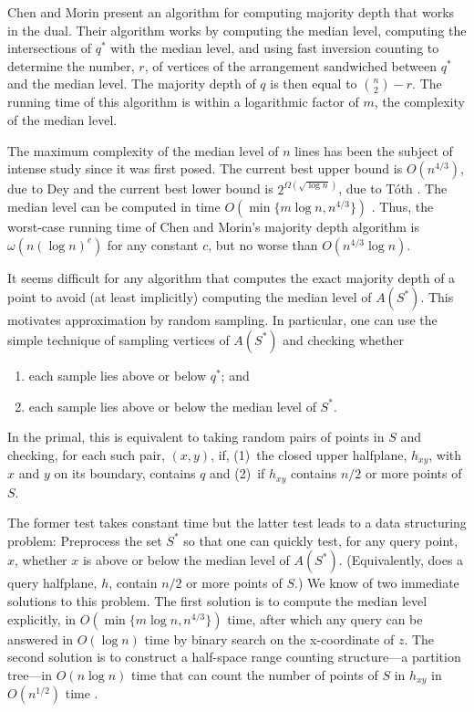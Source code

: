 \documentclass{patmorin}
\begin{document}
Chen and Morin \cite{cm11} present an algorithm for computing majority
depth that works in the dual.  Their algorithm works by computing the
median level, computing the intersections of $q^*$ with the median
level, and using fast inversion counting to determine the number, $r$,
of vertices of the arrangement sandwiched between $q^*$ and the median
level.  The majority depth of $q$ is then equal to $\binom{n}{2}-r$.
The running time of this algorithm is within a logarithmic factor of $m$,
the complexity of the median level.

The maximum complexity of the median level of $n$ lines has been the
subject of intense study since it was first posed.  The current best
upper bound is $O(n^{4/3})$, due to Dey \cite{d98} and the current best
lower bound is $2^{\Omega(\sqrt{\log n})}$, due to T\'oth \cite{t00}.
The median level can be computed in time $O(\min\{m\log n,n^{4/3}\})$
\cite{bj02,c99}.  Thus, the worst-case running time of Chen and Morin's
majority depth algorithm is $\omega(n(\log n)^c)$ for any constant $c$,
but no worse than $O(n^{4/3}\log n)$.

It seems difficult for any algorithm that computes the exact majority
depth of a point to avoid (at least implicitly) computing the median
level of $A(S^*)$.  This motivates approximation by random sampling.
In particular, one can use the simple technique of sampling vertices of
$A(S^*)$ and checking whether
\begin{enumerate}
  \item each sample lies above or below $q^*$; and
  \item each sample lies above or below the median level of $S^*$.
\end{enumerate}
In the primal, this is equivalent to taking random pairs of points in
$S$ and checking, for each such pair, $(x,y)$, if, (1)~the closed
upper halfplane, $h_{xy}$, with $x$ and $y$ on its boundary, contains $q$
and (2)~if $h_{xy}$ contains
 $n/2$ or more points of $S$.

The former test takes constant time but the latter test leads to a
data structuring problem:  Preprocess the set $S^*$ so that one can
quickly test, for any query point, $x$, whether $x$ is above or below
the median level of $A(S^*)$.  (Equivalently, does a query halfplane, $h$,
contain $n/2$ or more points of $S$.)  We know of two immediate solutions
to this problem.  The first solution is to compute the median level
explicitly, in $O(\min\{m\log n,n^{4/3}\})$ time, after which any query
can be answered in $O(\log n)$ time by binary search on the x-coordinate
of $z$.  The second solution is to construct a half-space range counting
structure---a partition tree---in $O(n\log n)$ time that can count the
number of points of $S$ in $h_{xy}$ in $O(n^{1/2})$ time \cite{c12}.
\end{document}
